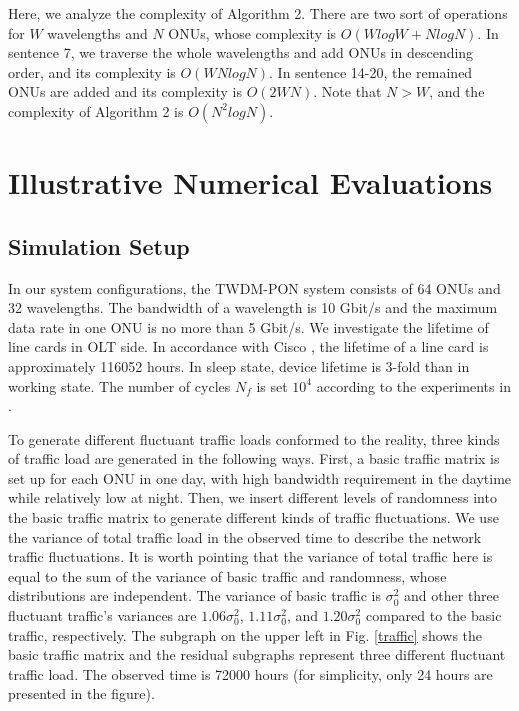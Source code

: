 \documentclass[letter]{IEEEtran}
\begin{document}
\vspace{-3.0mm}
Here, we analyze the complexity of Algorithm 2. There are two sort of operations for $W$ wavelengths and $N$ ONUs, whose complexity is $O(WlogW + NlogN)$. In sentence 7, we traverse the whole wavelengths and add ONUs in descending order, and its complexity is $O(WNlogN)$. In sentence 14-20, the remained ONUs are added and its complexity is $O(2WN)$. Note that $N > W$, and the complexity of Algorithm 2 is $O(N^2logN)$.
\vspace{-4.0mm}

\section{Illustrative Numerical Evaluations}
\subsection{Simulation Setup}
In our system configurations, the TWDM-PON system consists of 64 ONUs and 32 wavelengths. The bandwidth of a wavelength is 10 Gbit/s and the maximum data rate in one ONU is no more than 5 Gbit/s. We investigate the lifetime of line cards in OLT side. In accordance with Cisco \cite{cisco}, the lifetime of a line card is approximately 116052 hours. In sleep state, device lifetime is 3-fold than in working state. The number of cycles $ N_{f} $ is set $ 10^{4}$ according to the experiments in \cite{toshiba}\cite{ghaffarian2000accelerated}. 

To generate different fluctuant traffic loads conformed to the reality, three kinds of traffic load are generated in the following ways. First, a basic traffic matrix is set up for each ONU in one day, with high bandwidth requirement in the daytime while relatively low at night. Then, we insert different levels of randomness into the basic traffic matrix to generate different kinds of traffic fluctuations. We use the variance of total traffic load in the observed time to describe the network traffic fluctuations. It is worth pointing that the variance of total traffic here is equal to the sum of the variance of basic traffic and randomness, whose distributions are independent. The variance of basic traffic is $ \sigma_{0}^{2} $ and other three fluctuant traffic's variances are $ 1.06\sigma_{0}^{2} $,  $ 1.11\sigma_{0}^{2} $, and  $ 1.20\sigma_{0}^{2} $ compared to the basic traffic, respectively. The subgraph on the upper left in Fig. \ref{traffic} shows the basic traffic matrix and the residual subgraphs represent three different fluctuant traffic load. The observed time is 72000 hours (for simplicity, only 24 hours are presented in the figure).
\end{document}
